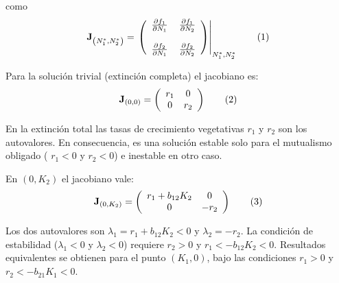 \noindent como
\begin{equation}
\mathbf{J}_{\left(N^{*}_1,N^{*}_2\right)}= \left.\left(
  \begin{array}{cc}
    \frac{\partial f_1}{\partial N_1} \, & \frac{\partial f_1}{\partial N_2}\\
    \\
        \frac{\partial f_2}{\partial N_1} \,& \frac{\partial f_2}{\partial N_2}
    \end{array} \right)\right|_{N^{*}_1,N^{*}_2}
\stepcounter{equation}\tag{\theequation}\label{eq:Jacob01}
\end{equation}

Para la solución trivial (extinción completa) el jacobiano es:
\begin{equation}
\mathbf{J}_{\left(0,0\right)}= \left(
  \begin{array}{cc}
    r_1 & 0\\
    0 & r_2
    \end{array} \right)
\stepcounter{equation}\tag{\theequation}\label{eq:Jacob02}
\end{equation}

En la extinción total las tasas de crecimiento vegetativas $r_1$ y $r_2$ son los autovalores. En consecuencia, es una solución estable solo para el mutualismo obligado ( $r_{1}<0$ y $r_{2}<0$) e inestable en otro caso.

En $(0,K_2)$ el jacobiano vale:
\begin{equation}
\mathbf{J}_{\left(0,K_2\right)}= \left(
  \begin{array}{cc}
    r_1+b_{12}K_2 & 0\\
    0 & -r_2
    \end{array} \right)
\stepcounter{equation}\tag{\theequation}\label{eq:Jacob0K2}
\end{equation}

Los dos autovalores son $\lambda_1=r_{1}+b_{12}K_2<0$ y $\lambda_2=- r_{2}$. La condición de estabilidad ($\lambda_{1}<0$ y $\lambda_{2}<0$) requiere $r_{2} > 0$ y $r_{1}<-b_{12}K_{2}<0$. Resultados equivalentes se obtienen para el punto $(K_1,0)$, bajo las condiciones $r_{1} > 0$ y $r_{2}<-b_{21}K_{1}<0$.

